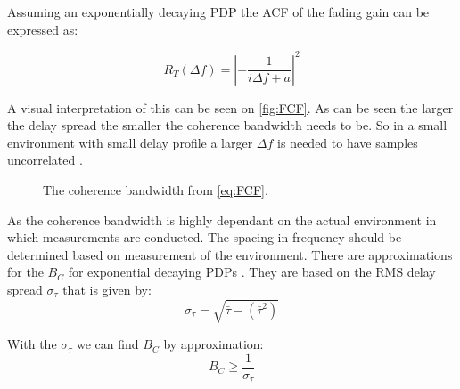 Assuming an exponentially decaying PDP the ACF of the fading gain can be expressed as:

\begin{equation}\label{eq:FCF}
R_T(\Delta f) = \left|-\frac{1}{i\Delta f+a}\right|^2
\end{equation}
\begin{where}
\end{where}

A visual interpretation of this can be seen on \autoref{fig:FCF}. As can be seen the larger the delay spread the smaller the coherence bandwidth needs to be. So in a small environment with small delay profile a larger $\Delta f$ is needed to have samples uncorrelated \citep[Chapter 18.5]{ComHandbook}.


\begin{figure}[H]
\centering

\caption{The coherence bandwidth from \autoref{eq:FCF}.}
\label{fig:FCF}
\end{figure}

As the coherence bandwidth is highly dependant on the actual environment in which measurements are conducted. The spacing in frequency should be determined based on measurement of the environment.
There are approximations for the $B_C$ for exponential decaying \gls{PDP}s
\citep{RayFadeHandbook}. They are based on  the RMS delay spread $\sigma_{\tau}$ that is given by:
\begin{equation}
\sigma_{\tau} = \sqrt{\bar{\tau} - {(\bar{\tau}^{2})}}
\end{equation}

\begin{where}
\end{where}

With the $\sigma_{\tau}$ we can find $B_C$ by approximation\citep{gold_wireless}:
\begin{equation}
B_C \geq \frac{1}{\sigma_{\tau}}
\label{CohBW}
\end{equation}







